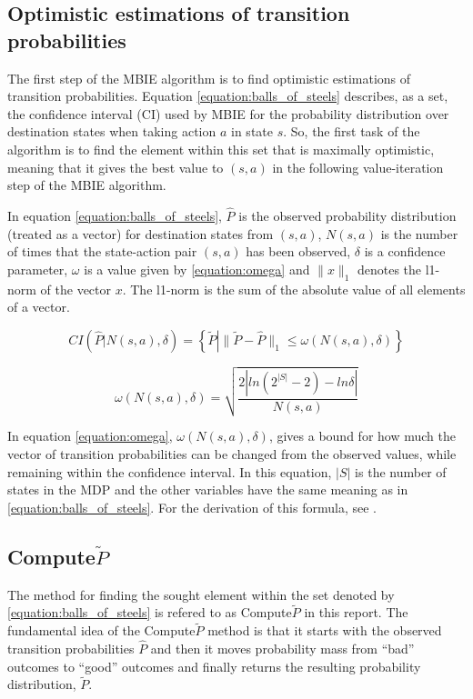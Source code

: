 
\subsection{Optimistic estimations of transition probabilities}
\label{sec:computep}

The first step of the MBIE algorithm is to find optimistic estimations of transition probabilities. Equation \eqref{equation:balls_of_steels} describes, as a set, the confidence interval (CI) used by MBIE for the probability distribution over destination states when taking action $a$ in state $s$. So, the first task of the algorithm is to find the element within this set that is maximally optimistic, meaning that it gives the best value to $(s,a)$ in the following value-iteration step of the MBIE algorithm. 

In equation \eqref{equation:balls_of_steels}, $\hat{P}$ is the observed probability distribution (treated as a vector) for destination states from $(s,a)$, $N(s,a)$ is the number of times that the state-action pair $(s,a)$ has been observed, $\delta$ is a confidence parameter,  $\omega$ is a value given by \eqref{equation:omega} and $\|x\|_1$ denotes the l1-norm of the vector $x$. The l1-norm is the sum of the absolute value of all elements of a vector. 

\begin{equation}
\label{equation:balls_of_steels}
CI\left(\hat{P} \left| N(s, a), \delta\right.\right)  = \left\{\tilde{P} \left| \|\tilde{P} - \hat{P}\|_1 \le \omega(N(s,a), \delta)\right.\right\}
\end{equation}

\begin{equation}
\label{equation:omega}
   \omega(N(s,a),\delta) = {\sqrt{\frac{2|ln(2^{|S|}-2) - ln  \delta |}{N(s,a)}}}
\end{equation}

In equation \eqref{equation:omega}, $\omega(N(s,a),\delta)$, gives a bound for how much the vector of transition probabilities can be changed from the observed values, while remaining within the confidence interval. In this equation, $|S|$ is the number of states in the MDP and the other variables have the same meaning as in \eqref{equation:balls_of_steels}. For the derivation of this formula, see  \textcite{Strehl20081309}.

\subsection{Compute$\tilde{P}$}
The method for finding the sought element within the set denoted by \eqref{equation:balls_of_steels} 
is refered to as Compute$\tilde{P}$ in this report. 
The fundamental idea of the Compute$\tilde{P}$ method is that it starts with
the observed transition probabilities $\hat{P}$ and then it moves probability
mass from ``bad'' outcomes to ``good'' outcomes and finally returns the resulting probability distribution, $\tilde{P}$. 


